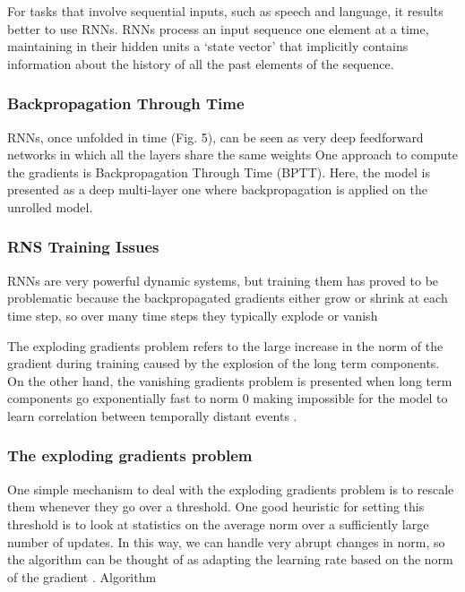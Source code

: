 For tasks that involve sequential inputs, such as speech and language, it results better to use RNNs. RNNs process an input sequence one element at a time, maintaining in their hidden units a ‘state vector’ that implicitly contains information about the history of all the past elements of the sequence.\cite{lecun2015deep}


\subsubsection{Backpropagation Through Time}

RNNs, once unfolded in time (Fig. 5), can be seen as very deep feedforward networks in which all the layers share the same weights\cite{lecun2015deep}
One approach to compute the gradients is Backpropagation Through Time (BPTT). Here, the model is presented as a deep multi-layer one where backpropagation is applied on the unrolled model\cite{pascanu2013difficulty}.


\subsubsection{RNS Training Issues}
RNNs are very powerful dynamic systems, but training them has proved to be problematic because the backpropagated gradients either grow or shrink at each time step, so over many time steps they typically explode or vanish\cite{lecun2015deep}

The exploding gradients problem refers to the large increase in the norm of the gradient during training caused by the explosion of the long term components. On the other hand, the vanishing gradients problem is presented when long term components go exponentially fast to norm 0 making impossible for the model to learn correlation between temporally distant events \cite{pascanu2013difficulty}. 

\subsubsection*{The exploding gradients problem }

 One simple mechanism to deal with the exploding gradients problem is to rescale them whenever they go over a threshold. One good heuristic for setting this threshold is to look at statistics on the average norm over a sufficiently large number of updates. In this way, we can handle very abrupt changes in norm, so the algorithm can be thought of as adapting the learning rate based on the norm of the gradient  \cite{pascanu2013difficulty}.
Algorithm
